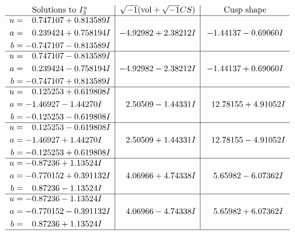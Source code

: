\documentclass[1p]{elsarticle_modified}
\theoremstyle{definition}
\newcommand{\I}{\sqrt{-1}}
\begin{document}
$$\begin{array}{c|c|c}  
\text{Solutions to }I^u_{3}& \I (\text{vol} + \sqrt{-1}CS) & \text{Cusp shape}\\
 \hline 
\begin{aligned}
u &= \phantom{-}0.747107 + 0.813589 I \\
a &= \phantom{-}0.239424 + 0.758194 I \\
b &= -0.747107 - 0.813589 I\end{aligned}
 & -4.92982 + 2.38212 I & -1.44137 - 0.69060 I \\ \hline\begin{aligned}
u &= \phantom{-}0.747107 - 0.813589 I \\
a &= \phantom{-}0.239424 - 0.758194 I \\
b &= -0.747107 + 0.813589 I\end{aligned}
 & -4.92982 - 2.38212 I & -1.44137 + 0.69060 I \\ \hline\begin{aligned}
u &= \phantom{-}0.125253 + 0.619808 I \\
a &= -1.46927 - 1.44270 I \\
b &= -0.125253 - 0.619808 I\end{aligned}
 & \phantom{-}2.50509 - 1.44331 I & \phantom{-}12.78155 + 4.91052 I \\ \hline\begin{aligned}
u &= \phantom{-}0.125253 - 0.619808 I \\
a &= -1.46927 + 1.44270 I \\
b &= -0.125253 + 0.619808 I\end{aligned}
 & \phantom{-}2.50509 + 1.44331 I & \phantom{-}12.78155 - 4.91052 I \\ \hline\begin{aligned}
u &= -0.87236 + 1.13524 I \\
a &= -0.770152 + 0.391132 I \\
b &= \phantom{-}0.87236 - 1.13524 I\end{aligned}
 & \phantom{-}4.06966 + 4.74338 I & \phantom{-}5.65982 - 6.07362 I \\ \hline\begin{aligned}
u &= -0.87236 - 1.13524 I \\
a &= -0.770152 - 0.391132 I \\
b &= \phantom{-}0.87236 + 1.13524 I\end{aligned}
 & \phantom{-}4.06966 - 4.74338 I & \phantom{-}5.65982 + 6.07362 I\\
 \hline 
 \end{array}$$\newpage
\end{document}
